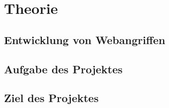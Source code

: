\chapter{Theorie}
\section{Entwicklung von Webangriffen}

\section{Aufgabe des Projektes}

\section{Ziel des Projektes}
